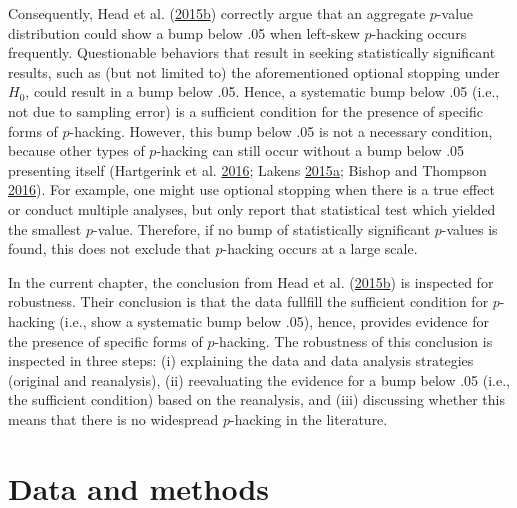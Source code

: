 \documentclass[a5paper]{book}
\begin{document}
Consequently, Head et al.
(\protect\hyperlink{ref-doi:10.1371ux2fjournal.pbio.1002106}{2015}\protect\hyperlink{ref-doi:10.1371ux2fjournal.pbio.1002106}{b})
correctly argue that an aggregate \(p\)-value distribution could show a
bump below .05 when left-skew \(p\)-hacking occurs frequently.
Questionable behaviors that result in seeking statistically significant
results, such as (but not limited to) the aforementioned optional
stopping under \(H_0\), could result in a bump below .05. Hence, a
systematic bump below .05 (i.e., not due to sampling error) is a
sufficient condition for the presence of specific forms of
\(p\)-hacking. However, this bump below .05 is not a necessary
condition, because other types of \(p\)-hacking can still occur without
a bump below .05 presenting itself (Hartgerink et al.
\protect\hyperlink{ref-doi:10.7717ux2fpeerj.1935}{2016}; Lakens
\protect\hyperlink{ref-doi:10.1080ux2f17470218.2014.982664}{2015}\protect\hyperlink{ref-doi:10.1080ux2f17470218.2014.982664}{a};
Bishop and Thompson
\protect\hyperlink{ref-doi:10.7717ux2fpeerj.1715}{2016}). For example,
one might use optional stopping when there is a true effect or conduct
multiple analyses, but only report that statistical test which yielded
the smallest \(p\)-value. Therefore, if no bump of statistically
significant \(p\)-values is found, this does not exclude that
\(p\)-hacking occurs at a large scale.

In the current chapter, the conclusion from Head et al.
(\protect\hyperlink{ref-doi:10.1371ux2fjournal.pbio.1002106}{2015}\protect\hyperlink{ref-doi:10.1371ux2fjournal.pbio.1002106}{b})
is inspected for robustness. Their conclusion is that the data fullfill
the sufficient condition for \(p\)-hacking (i.e., show a systematic bump
below .05), hence, provides evidence for the presence of specific forms
of \(p\)-hacking. The robustness of this conclusion is inspected in
three steps: (i) explaining the data and data analysis strategies
(original and reanalysis), (ii) reevaluating the evidence for a bump
below .05 (i.e., the sufficient condition) based on the reanalysis, and
(iii) discussing whether this means that there is no widespread
\(p\)-hacking in the literature.

\section{Data and methods}\label{data-and-methods}
\end{document}
